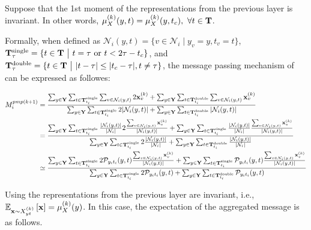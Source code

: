 Suppose that the 1st moment of the representations from the previous layer is invariant. In other words, $\mu_{X}^{(k)}(y,t)=\mu_{X}^{(k)}(y,t_{c}),\ \forall t\in\bold{T}$.

Formally, when defined as $\mathcal{N}_i (y,t) = \{v \in \mathcal{N}_i \mid y_v=y, t_v=t \}$, $\bold{T}_{\tau}^{\text{single}}= \{t \in \bold{T}\ \big |\  t =\tau \text{ or }t<2\tau-t_{c}\}$, and $\bold{T}_{\tau}^{\text{double}}= \{t \in \bold{T}\ \big | \ |t- \tau| \le|t_{c}-\tau|, t\neq \tau\}$, the message passing mechanism of \PMP can be expressed as followes:

\begin{align}
M_{i}^{pmp(k+1)} &= {\sum_{y\in \bold{Y}}\sum_{t\in\bold{T}_{t_i}^{\text{single}}}\sum_{v\in \mathcal{N}_{i}(y, t) }2\bold{x}_v^{(k)}+\sum_{y\in \bold{Y}}\sum_{t\in\bold{T}_{t_i}^{\text{double}}}\sum_{v\in \mathcal{N}_{i}(y, t) }\bold{x}_v^{(k)}\over \sum_{y\in \bold{Y}}\sum_{t\in\bold{T}_{t_i}^{\text{single}}}2|\mathcal{N}_{i}(y, t)|+\sum_{y\in \bold{Y}}\sum_{t\in\bold{T}_{t_i}^{\text{double}}}|\mathcal{N}_{i}(y, t)|}\\&={\sum_{y\in \bold{Y}}\sum_{t\in\bold{T}_{t_i}^{\text{single}}}{|\mathcal{N}_i(y,t)|\over |\mathcal{N}_i|}2{\sum_{v\in \mathcal{N}_{i}(y, t) }\bold{x}_v^{(k)} \over |\mathcal{N}_i(y,t)|}+\sum_{y\in \bold{Y}}\sum_{t\in\bold{T}_{t_i}^{\text{single}}}{|\mathcal{N}_i(y,t)|\over |\mathcal{N}_i|}{\sum_{v\in \mathcal{N}_{i}(y, t) }\bold{x}_v^{(k)} \over |\mathcal{N}_i(y,t)|}\over \sum_{y\in \bold{Y}}\sum_{t\in\bold{T}_{t_i}^{\text{single}}}2{|\mathcal{N}_{i}(y, t)|\over| \mathcal{N}_i|}+\sum_{y\in \bold{Y}}\sum_{t\in\bold{T}_{t_i}^{\text{double}}}{|\mathcal{N}_{i}(y, t)|\over| \mathcal{N}_i|}}\\ &\simeq {\sum_{y\in \bold{Y}}\sum_{t\in\bold{T}_{t_i}^{\text{single}}}2{\mathcal{P}_{y_i t_i}(y,t)}{\sum_{v\in \mathcal{N}_{i}(y, t) }\bold{x}_v^{(k)} \over |\mathcal{N}_i(y,t)|}+\sum_{y\in \bold{Y}}\sum_{t\in\bold{T}_{t_i}^{\text{single}}}{\mathcal{P}_{y_i t_i}(y,t)}{\sum_{v\in \mathcal{N}_{i}(y, t) }\bold{x}_v^{(k)} \over |\mathcal{N}_i(y,t)|}\over \sum_{y\in \bold{Y}}\sum_{t\in\bold{T}_{t_i}^{\text{single}}}2{\mathcal{P}_{y_i t_i}(y,t)}+\sum_{y\in \bold{Y}}\sum_{t\in\bold{T}_{t_i}^{\text{double}}}{\mathcal{P}_{y_i t_i}(y,t)}}
\end{align}

Using the representations from the previous layer are invariant, i.e., $\mathbb{E}_{\bold{x}\sim {X_{yt}^{(k)}}}\left[\bold{x}\right]=\mu_{X}^{(k)}(y)$. In this case, the expectation of the aggregated message is as follows.

